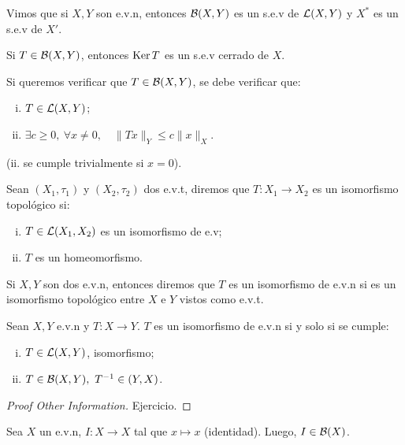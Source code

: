 
Vimos que si $X,Y$ son e.v.n, entonces $\mathcal{B}(X,Y)$ es un s.e.v de $\mathcal{L}(X,Y)$ y $X^{*}$ es un s.e.v de $X'$.

\begin{eg}
	Si $T \in \mathcal{B}(X,Y)$, entonces $\operatorname{Ker} T$ es un s.e.v cerrado de $X$.
\end{eg}

\begin{observe}
	Si queremos verificar que $T \in \mathcal{B}(X,Y)$, se debe verificar que:
	\begin{enumerate}[i)]
		\item $T \in \mathcal{L}(X,Y)$;

		\item $\exists c \geq 0,\ \forall x \neq 0, \quad \| Tx \|_{Y} \leq c \| x \|_{X}$.
	\end{enumerate}
	(ii. se cumple trivialmente si $x = 0$).
\end{observe}

\begin{definition}[isomorfismo]
	Sean $(X_{1}, \tau_{1})$ y $(X_{2}, \tau_{2})$ dos e.v.t, diremos que $T \colon X_{1} \to X_{2}$ es un isomorfismo topológico si:
	\begin{enumerate}[i)]
		\item $T \in \mathcal{L}(X_{1},X_{2})$ es un isomorfismo de e.v;

		\item $T$ es un homeomorfismo.
	\end{enumerate}
	Si $X,Y$ son dos e.v.n, entonces diremos que $T$ es un isomorfismo de e.v.n si es un isomorfismo topológico entre $X$ e $Y$ vistos como e.v.t.
\end{definition}

\begin{prop}
	Sean $X,Y$ e.v.n y $T \colon X \to Y$. $T$ es un isomorfismo de e.v.n si y solo si se cumple:
	\begin{enumerate}[i)]
		\item $T \in \mathcal{L}(X,Y)$, isomorfismo;

		\item $T \in \mathcal{B}(X,Y),\ T^{-1} \in \mathcal{(}Y,X)$.
	\end{enumerate}
\end{prop}
\begin{proof}[Proof Other Information]
	Ejercicio.
\end{proof}

\begin{eg}
	Sea $X$ un e.v.n, $I \colon X \to X$ tal que $x \mapsto x$ (identidad). Luego, $I \in \mathcal{B}(X)$.
\end{eg}


